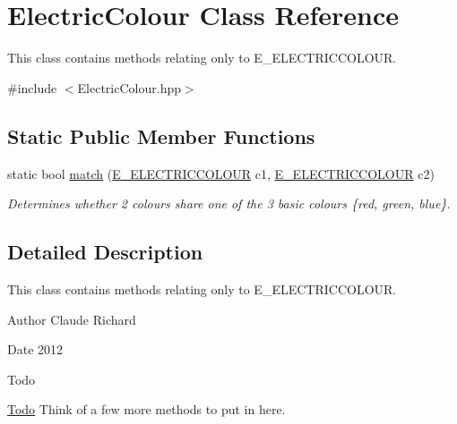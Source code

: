 \hypertarget{class_electric_colour}{\section{Electric\-Colour Class Reference}
\label{class_electric_colour}
}


This class contains methods relating only to E\-\_\-\-E\-L\-E\-C\-T\-R\-I\-C\-C\-O\-L\-O\-U\-R.  




{\ttfamily \#include $<$Electric\-Colour.\-hpp$>$}

\subsection*{Static Public Member Functions}
\begin{DoxyCompactItemize}
\item 
static bool \hyperlink{class_electric_colour_a5419c95b756ca5204ec763a7323c721c}{match} (\hyperlink{_electric_colour_8hpp_a1979e84576b59c4d100d8a8cc41de734}{E\-\_\-\-E\-L\-E\-C\-T\-R\-I\-C\-C\-O\-L\-O\-U\-R} c1, \hyperlink{_electric_colour_8hpp_a1979e84576b59c4d100d8a8cc41de734}{E\-\_\-\-E\-L\-E\-C\-T\-R\-I\-C\-C\-O\-L\-O\-U\-R} c2)
\begin{DoxyCompactList}\small\item\em Determines whether 2 colours share one of the 3 basic colours \{red, green, blue\}. \end{DoxyCompactList}\end{DoxyCompactItemize}


\subsection{Detailed Description}
This class contains methods relating only to E\-\_\-\-E\-L\-E\-C\-T\-R\-I\-C\-C\-O\-L\-O\-U\-R. 

\begin{DoxyAuthor}{Author}
Claude Richard 
\end{DoxyAuthor}
\begin{DoxyDate}{Date}
2012 
\end{DoxyDate}
\begin{DoxyRefDesc}{Todo}
\item[\hyperlink{todo__todo000009}{Todo}]Think of a few more methods to put in here. \end{DoxyRefDesc}



